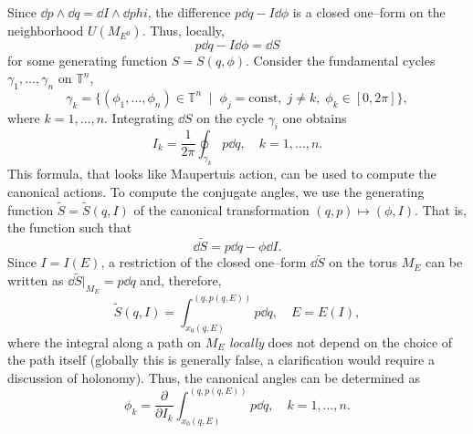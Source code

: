 \documentclass[english,fontsize=11pt,paper=b5]{scrbook}
\numberwithin{equation}{chapter}
\theoremstyle{definition}
\begin{document}
      Since $\dd{p} \wedge \dd {q} = \dd{I} \wedge \dd {phi}$, the difference $p\dd q - I\dd \phi$ is a closed one--form on the neighborhood $U(M_{E^0})$. Thus, locally,
      \begin{equation}
        p\dd{q} - I\dd{\phi} = \dd{S}
      \end{equation}
      for some generating function $S = S(q,\phi)$.
      Consider the fundamental cycles $\gamma_1, \ldots, \gamma_n$ on $\mathbb{T}^n$,
      \begin{equation}
        \gamma_k = \big\{
          (\phi_1, \ldots, \phi_n) \in \mathbb{T}^n \;\mid\; \phi_j = \mathrm{const}, \; j\neq k,\; \phi_k \in [0,2\pi]
        \big\},
      \end{equation}
      where $k=1,\ldots,n$.
      Integrating $\dd S$ on the cycle $\gamma_i$ one obtains
      \begin{equation}
        I_k = \frac1{2\pi} \oint_{\gamma_k} p \dd{q}, \quad k=1,\ldots,n.
      \end{equation}
      This formula, that looks like Maupertuis action, can be used to compute the canonical actions.
      To compute the conjugate angles, we use the generating function $\widetilde S = \widetilde S(q,I)$ of the canonical transformation $(q,p) \mapsto (\phi, I)$. That is, the function such that
      \begin{equation}
        \dd{\widetilde{S}} = p\dd{q} - \phi \dd{I}.
      \end{equation}
      Since $I = I(E)$, a restriction of the closed one--form $\dd{\widetilde S}$ on the torus $M_E$ can be written as $\dd{\widetilde S}\big|_{M_E} = p\dd{q}$ and, therefore,
      \begin{equation}
        \widetilde S(q,I) = \int_{x_0(q,E)}^{(q, p(q,E))} p \dd{q}, \quad E = E(I),
      \end{equation}
      where the integral along a path on $M_E$ \emph{locally} does not depend on the choice of the path itself (globally this is generally false, a clarification would require a discussion of holonomy).
      Thus, the canonical angles can be determined as
      \begin{equation}
        \phi_k = \frac{\partial}{\partial I_k} \int_{x_0(q,E)}^{(q, p(q,E))} p \dd q, \quad k=1,\ldots,n.
      \end{equation}
\end{document}
